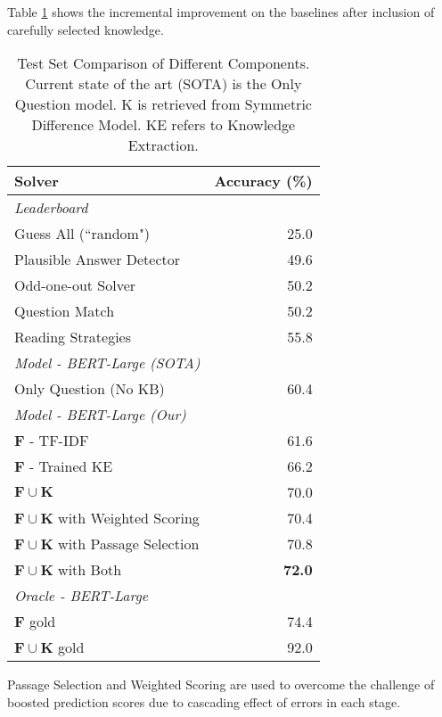 \documentclass[11pt,a4paper]{article}
\begin{document}
Table \ref{exp:finalresults} shows the incremental improvement on the baselines after inclusion of carefully selected knowledge.
\begin{table}[t!]
\begin{tabular}{|lr|}
\hline
\textbf{Solver} & \textbf{Accuracy} (\%)\\
\hline
\textit{Leaderboard} & \\
Guess All (``random") & 25.0\\
Plausible Answer Detector & 49.6\\
Odd-one-out Solver & 50.2\\
Question Match & 50.2\\
Reading Strategies & 55.8\\
\hline
\textit{Model - BERT-Large (SOTA)} & \\
Only Question (No KB) & 60.4 \\
\hline
\textit{Model - BERT-Large (Our)} &  \\
$\mathbf{F}$ - TF-IDF& 61.6\\
$\mathbf{F}$ - Trained KE & 66.2\\
$\mathbf{F} \cup \mathbf{K}$& 70.0\\
$\mathbf{F} \cup \mathbf{K}$ with Weighted Scoring& 70.4\\
$\mathbf{F} \cup \mathbf{K}$ with Passage Selection& 70.8\\
$\mathbf{F} \cup \mathbf{K}$ with Both& \textbf{72.0}\\
\hline
\textit{Oracle - BERT-Large} &  \\
$\mathbf{F}$ gold & 74.4\\
$\mathbf{F} \cup \mathbf{K}$ gold & 92.0\\
\hline
\end{tabular}
\caption{Test Set Comparison of Different Components. Current state of the art (SOTA) is the Only Question model. K is retrieved from Symmetric Difference Model. KE refers to Knowledge Extraction.}
  \label{exp:finalresults}
\end{table}




Passage Selection and Weighted Scoring are used to overcome the challenge of boosted prediction scores due to cascading effect of errors in each stage. \\

\noindent
{} \\
\end{document}
